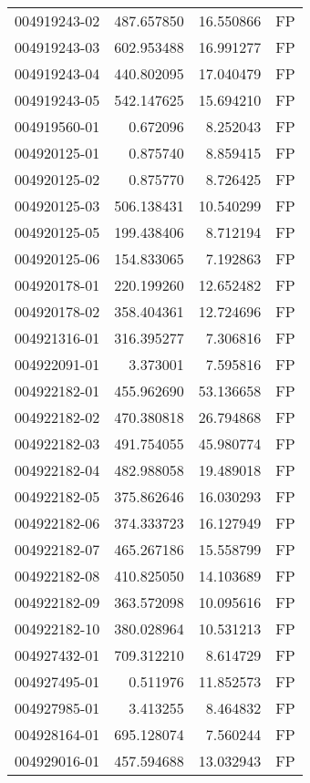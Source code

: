 \begin{tabular}{lrrl}
004919243-02 &  487.657850 &    16.550866 &   FP \\
004919243-03 &  602.953488 &    16.991277 &   FP \\
004919243-04 &  440.802095 &    17.040479 &   FP \\
004919243-05 &  542.147625 &    15.694210 &   FP \\
004919560-01 &    0.672096 &     8.252043 &   FP \\
004920125-01 &    0.875740 &     8.859415 &   FP \\
004920125-02 &    0.875770 &     8.726425 &   FP \\
004920125-03 &  506.138431 &    10.540299 &   FP \\
004920125-05 &  199.438406 &     8.712194 &   FP \\
004920125-06 &  154.833065 &     7.192863 &   FP \\
004920178-01 &  220.199260 &    12.652482 &   FP \\
004920178-02 &  358.404361 &    12.724696 &   FP \\
004921316-01 &  316.395277 &     7.306816 &   FP \\
004922091-01 &    3.373001 &     7.595816 &   FP \\
004922182-01 &  455.962690 &    53.136658 &   FP \\
004922182-02 &  470.380818 &    26.794868 &   FP \\
004922182-03 &  491.754055 &    45.980774 &   FP \\
004922182-04 &  482.988058 &    19.489018 &   FP \\
004922182-05 &  375.862646 &    16.030293 &   FP \\
004922182-06 &  374.333723 &    16.127949 &   FP \\
004922182-07 &  465.267186 &    15.558799 &   FP \\
004922182-08 &  410.825050 &    14.103689 &   FP \\
004922182-09 &  363.572098 &    10.095616 &   FP \\
004922182-10 &  380.028964 &    10.531213 &   FP \\
004927432-01 &  709.312210 &     8.614729 &   FP \\
004927495-01 &    0.511976 &    11.852573 &   FP \\
004927985-01 &    3.413255 &     8.464832 &   FP \\
004928164-01 &  695.128074 &     7.560244 &   FP \\
004929016-01 &  457.594688 &    13.032943 &   FP \\

\end{tabular}
